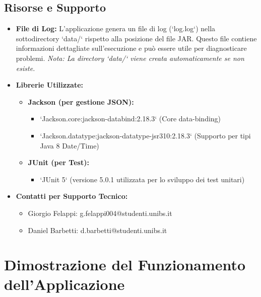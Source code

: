 \documentclass[a4paper,12pt]{article}
\begin{document}
\subsection{Risorse e Supporto}
\begin{itemize}
    \item \textbf{File di Log:} L'applicazione genera un file di log (`log.log`) nella sottodirectory `data/` rispetto alla posizione del file JAR. Questo file contiene informazioni dettagliate sull'esecuzione e può essere utile per diagnosticare problemi. \textit{Nota: La directory `data/` viene creata automaticamente se non esiste.}

    \item \textbf{Librerie Utilizzate:}
        \begin{itemize}
            \item \textbf{Jackson (per gestione JSON):}
                \begin{itemize}
                    \item `Jackson.core:jackson-databind:2.18.3` (Core data-binding)
                    \item `Jackson.datatype:jackson-datatype-jsr310:2.18.3` (Supporto per tipi Java 8 Date/Time)
                \end{itemize}
            \item \textbf{JUnit (per Test):}
                \begin{itemize}
                    \item `JUnit 5` (versione 5.0.1 utilizzata per lo sviluppo dei test unitari)
                \end{itemize}
        \end{itemize}

    \item \textbf{Contatti per Supporto Tecnico:}
        \begin{itemize}
            \item Giorgio Felappi: g.felappi004@studenti.unibs.it
            \item Daniel Barbetti: d.barbetti@studenti.unibs.it
        \end{itemize}
\end{itemize}

\newpage
\section{Dimostrazione del Funzionamento dell'Applicazione}
\end{document}
